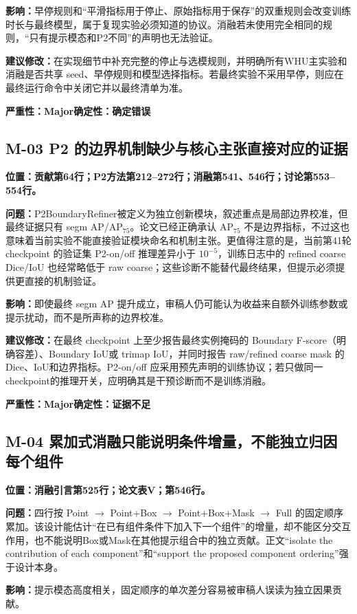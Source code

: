 \documentclass[UTF8,a4paper,11pt]{ctexart}
\newcommand{\sev}[1]{\textbf{严重性：#1}}
\newcommand{\cert}[1]{\textbf{确定性：#1}}
\newcommand{\loc}[1]{\textbf{位置：#1}}
\newcommand{\prob}{\textbf{问题：}}
\newcommand{\impact}{\textbf{影响：}}
\newcommand{\fix}{\textbf{建议修改：}}
\begin{document}
\impact 早停规则和“平滑指标用于停止、原始指标用于保存”的双重规则会改变训练时长与最终模型，属于复现实验必须知道的协议。消融若未使用完全相同的规则，“只有提示模态和P2不同”的声明也无法验证。

\fix 在实现细节中补充完整的停止与选模规则，并明确所有WHU主实验和消融是否共享 seed、早停规则和模型选择指标。若最终实验不采用早停，则应在最终运行命令中关闭它并以最终清单为准。

\sev{Major}\quad \cert{确定错误}

\subsection*{M-03 P2 的边界机制缺少与核心主张直接对应的证据}
\loc{贡献第64行；P2方法第212--272行；消融第541、546行；讨论第553--554行。}

\prob P2BoundaryRefiner被定义为独立创新模块，叙述重点是局部边界校准，但最终证据只有 segm AP/AP$_{75}$。论文已经正确承认 AP$_{75}$ 不是边界指标，不过这也意味着当前实验不能直接验证模块命名和机制主张。更值得注意的是，当前第41轮 checkpoint 的验证集 P2-on/off 推理差异小于 $10^{-5}$，训练日志中的 refined coarse Dice/IoU 也经常略低于 raw coarse；这些诊断不能替代最终结果，但提示必须提供更直接的机制验证。

\impact 即使最终 segm AP 提升成立，审稿人仍可能认为收益来自额外训练参数或提示扰动，而不是所声称的边界校准。

\fix 在最终 checkpoint 上至少报告最终实例掩码的 Boundary F-score（明确容差）、Boundary IoU或 trimap IoU，并同时报告 raw/refined coarse mask 的 Dice、IoU和边界指标。P2-on/off 应采用预先声明的训练协议；若只做同一checkpoint的推理开关，应明确其是干预诊断而不是训练消融。

\sev{Major}\quad \cert{证据不足}

\subsection*{M-04 累加式消融只能说明条件增量，不能独立归因每个组件}
\loc{消融引言第525行；论文表V；第546行。}

\prob 四行按 Point $\to$ Point+Box $\to$ Point+Box+Mask $\to$ Full 的固定顺序累加。该设计能估计“在已有组件条件下加入下一个组件”的增量，却不能区分交互作用，也不能说明Box或Mask在其他提示组合中的独立贡献。正文“isolate the contribution of each component”和“support the proposed component ordering”强于设计本身。

\impact 提示模态高度相关，固定顺序的单次差分容易被审稿人误读为独立因果贡献。
\end{document}
